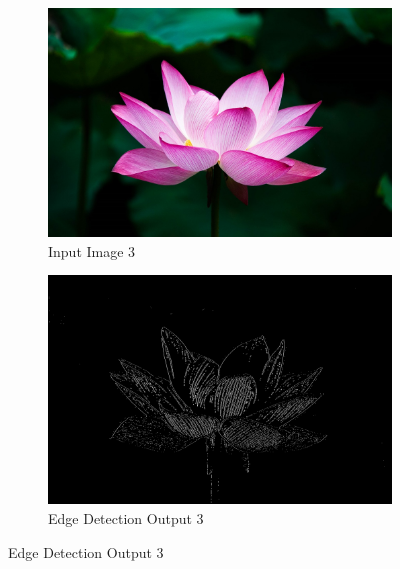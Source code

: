 \documentclass[12pt]{article}
\begin{document}
\clearpage

\begin{figure}[!ht]
	\centering

	\begin{subfigure}{0.45\textwidth}
		\includegraphics[width=\textwidth]{../images/lotus.jpg}
		\caption{Input Image 3}
	\end{subfigure}
	\hfill
	\begin{subfigure}{0.45\textwidth}
		\includegraphics[width=\textwidth]{../results/lotus.png}
		\caption{Edge Detection Output 3}
	\end{subfigure}

	\vspace{0.2cm}


\end{figure}
\end{document}

